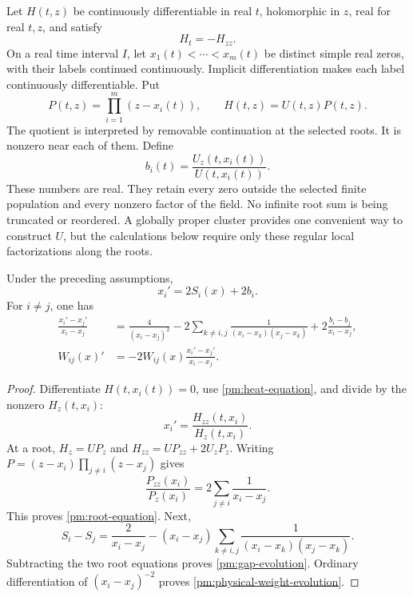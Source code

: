 Let \(H(t,z)\) be continuously differentiable in real \(t\), holomorphic
in \(z\), real for real \(t,z\), and satisfy
\begin{equation}
 H_t=-H_{zz}.
 \label{pm:heat-equation}
\end{equation}
On a real time interval \(I\), let \(x_1(t)<\cdots<x_m(t)\) be distinct
simple real zeros, with their labels continued continuously.  Implicit
differentiation makes each label continuously differentiable.  Put
\[
 P(t,z)=\prod_{i=1}^m(z-x_i(t)),\qquad H(t,z)=U(t,z)P(t,z).
\]
The quotient is interpreted by removable continuation at the selected
roots.  It is nonzero near each of them.  Define
\begin{equation}
 b_i(t)=\frac{U_z(t,x_i(t))}{U(t,x_i(t))}.
 \label{pm:exterior-unit}
\end{equation}
These numbers are real.  They retain every zero outside the selected
finite population and every nonzero factor of the field.  No infinite
root sum is being truncated or reordered.  A globally proper cluster
provides one convenient way to construct \(U\), but the calculations
below require only these regular local factorizations along the roots.

\begin{proposition}
\label{pm:complete-root-dynamics}
Under the preceding assumptions,
\begin{equation}
 x_i'=2S_i(x)+2b_i.
 \label{pm:root-equation}
\end{equation}
For \(i\ne j\), one has
\begin{align}
 \frac{x_i'-x_j'}{x_i-x_j}
  &=\frac4{(x_i-x_j)^2}
   -2\sum_{k\ne i,j}
        \frac1{(x_i-x_k)(x_j-x_k)}
   +2\frac{b_i-b_j}{x_i-x_j},
 \label{pm:gap-evolution}\\
 W_{ij}(x)'&=-2W_{ij}(x)\frac{x_i'-x_j'}{x_i-x_j}.
 \label{pm:physical-weight-evolution}
\end{align}
\end{proposition}

\begin{proof}
Differentiate \(H(t,x_i(t))=0\), use
\eqref{pm:heat-equation}, and divide by the nonzero \(H_z(t,x_i)\):
\[
 x_i'=\frac{H_{zz}(t,x_i)}{H_z(t,x_i)}.
\]
At a root, \(H_z=UP_z\) and \(H_{zz}=UP_{zz}+2U_zP_z\).
Writing \(P=(z-x_i)\prod_{j\ne i}(z-x_j)\) gives
\[
 \frac{P_{zz}(x_i)}{P_z(x_i)}
   =2\sum_{j\ne i}\frac1{x_i-x_j}.
\]
This proves \eqref{pm:root-equation}.  Next,
\[
 S_i-S_j=\frac2{x_i-x_j}
 -(x_i-x_j)\sum_{k\ne i,j}
       \frac1{(x_i-x_k)(x_j-x_k)}.
\]
Subtracting the two root equations proves
\eqref{pm:gap-evolution}.  Ordinary differentiation of
\((x_i-x_j)^{-2}\) proves
\eqref{pm:physical-weight-evolution}.
\end{proof}

